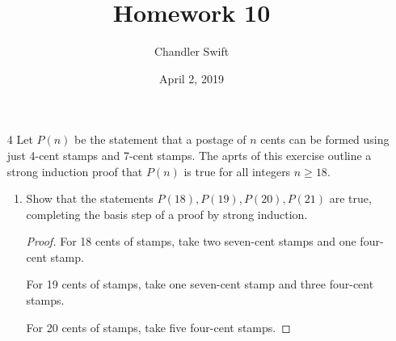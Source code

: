 \documentclass{article}
\title{Homework 10}
\author{Chandler Swift}
\date{April 2, 2019}
\begin{document}
\maketitle
\begin{enumerate}

%
%

  \item[4] Let $P(n)$ be the statement that a postage of $n$ cents can be
    formed using just 4-cent stamps and 7-cent stamps. The aprts of this
    exercise outline a strong induction proof that $P(n)$ is true for all
    integers $n \geq 18$. 
    \begin{enumerate}
      \item Show that the statements $P(18),P(19),P(20),P(21)$ are true,
        completing the basis step of a proof by strong induction.
        \begin{proof}
          For 18 cents of stamps, take two seven-cent stamps and one four-cent
          stamp.

          For 19 cents of stamps, take one seven-cent stamp and three four-cent
          stamps.

          For 20 cents of stamps, take five four-cent stamps.


\end{proof}
\end{enumerate}
\end{enumerate}
\end{document}
